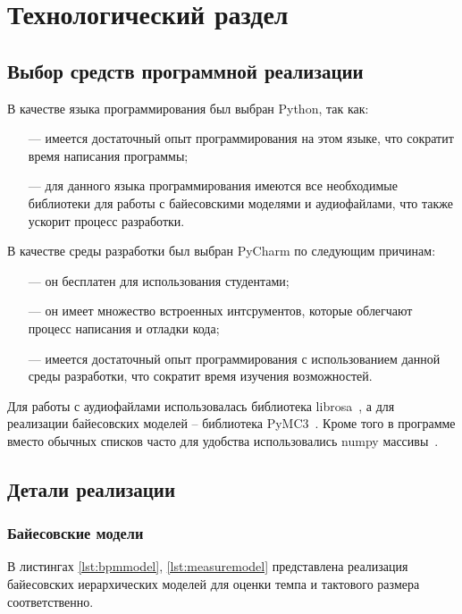 \section{Технологический раздел}

\subsection{Выбор средств программной реализации}

В качестве языка программирования был выбран Python, так как:

\begin{itemize}
	\item[---] имеется достаточный опыт программирования на этом языке, что сократит время написания программы;
	\item[---] для данного языка программирования имеются все необходимые библиотеки для работы с байесовскими моделями и аудиофайлами, что также ускорит процесс разработки.
\end{itemize}

В качестве среды разработки был выбран PyCharm по следующим причинам:

\begin{itemize}
	\item[---] он бесплатен для использования студентами;
	\item[---] он имеет множество встроенных интсрументов, которые облегчают процесс написания и отладки кода;
	\item[---] имеется достаточный опыт программирования с использованием данной среды разработки, что сократит время изучения возможностей.
\end{itemize}

Для работы с аудиофайлами использовалась библиотека librosa~\cite{librosa}, а для реализации байесовских моделей -- библиотека PyMC3~\cite{pymc3_docs}. Кроме того в программе вместо обычных списков часто для удобства использовались numpy массивы~\cite{numpy}.

\subsection{Детали реализации}

\subsubsection{Байесовские модели}

В листингах \ref{lst:bpmmodel}, \ref{lst:measuremodel} представлена реализация байесовских иерархических моделей для оценки темпа и тактового размера соответственно.

